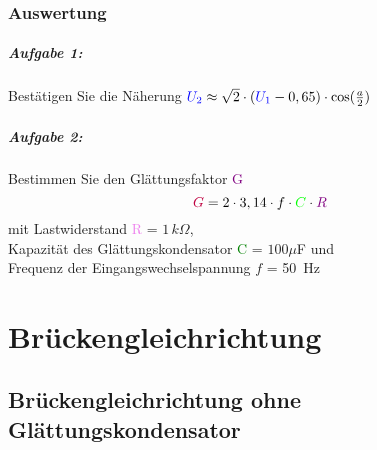 \documentclass[11pt,a4paper,titlepage]{scrreprt}
\newcommand{\spannung}[1]{\textcolor{blue}{#1}}
\newcommand{\widerstand}[1]{\textcolor{violet}{#1}}
\newcommand{\capacity}[1]{\textcolor{green}{#1}}
\newcommand{\glaettung}[1]{\textcolor{purple}{#1}}
\begin{document}
			\subsection{Auswertung}
				\paragraph{Aufgabe 1:} Bestätigen Sie die Näherung $\spannung{U_2} \approx  \sqrt{2} \cdot (\spannung{U_1} - 0,65) \cdot \cos(\frac{a}{2})$				
				
				\paragraph{Aufgabe 2:} Bestimmen Sie den Glättungsfaktor \glaettung{G}\\
					\begin{equation*}
						\glaettung{G} = 2 \cdot 3,14 \cdot f \cdot \capacity{C} \cdot \widerstand{R}
					\end{equation*}
					mit Lastwiderstand \widerstand{R} = $1\,k\Omega$,\\ 
					Kapazität des Glättungskondensator \capacity{C} = $100\mu$F und\\ 
					Frequenz der Eingangswechselspannung $f$ = 50~Hz
	
	\chapter{Brückengleichrichtung}
		\section{Brückengleichrichtung ohne Glättungskondensator}
\end{document}

